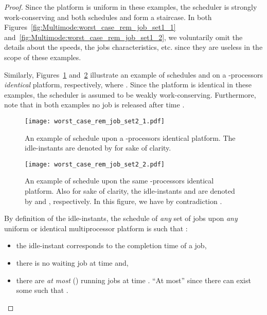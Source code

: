 \documentclass{article}
\newtheorem{validity test}{Validity Test}
\newtheorem{proof}{Proof}
\begin{document}
\begin{proof}
\noindent Since the platform is uniform in these examples, the scheduler is strongly work-conserving and both schedules  and  form a staircase. In both Figures~\ref{fig:Multimode:worst_case_rem_job_set1_1} and~\ref{fig:Multimode:worst_case_rem_job_set1_2}, we voluntarily omit the details about the  speeds, the jobs characteristics, etc. since they are useless in the scope of these examples.

Similarly, Figures~\ref{fig:Multimode:worst_case_rem_job_set2_1} and~\ref{fig:Multimode:worst_case_rem_job_set2_2} illustrate an example of schedules  and  on a -processors \emph{identical} platform, respectively, where . Since the platform is identical in these examples, the scheduler is assumed to be weakly work-conserving.  Furthermore, note that in both examples no job is released after time . 

\begin{figure}[t!]
\begin{center}
\texttt{[image: worst\_case\_rem\_job\_set2\_1.pdf]}
\caption{An example of schedule  upon a -processors identical platform. The idle-instants  are denoted by  for sake of clarity.}
\label{fig:Multimode:worst_case_rem_job_set2_1}
\end{center}
\end{figure}

\begin{figure}[t!]
\begin{center}
\texttt{[image: worst\_case\_rem\_job\_set2\_2.pdf]}
\caption{An example of schedule  upon the same -processors identical platform. Also for sake of clarity, the idle-instants  and  are denoted by  and , respectively. In this figure, we have by contradiction .}
\label{fig:Multimode:worst_case_rem_job_set2_2}
\end{center}
\end{figure}

By definition of the idle-instants, the schedule of \emph{any} set  of jobs upon \emph{any} uniform or identical multiprocessor platform is such that :
\begin{itemize}
\item the idle-instant  corresponds to the completion time of a job,
\item there is no waiting job at time  and,
\item there are \emph{at most} () running jobs at time . ``At most'' since there can exist some  such that .
\end{itemize}


\end{proof}
\end{document}
